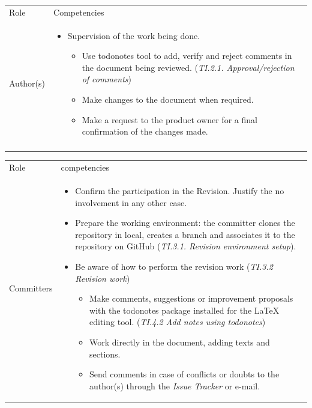 \documentclass{template/openetcs_article}
\begin{document}
\begin{flushleft}
\begin{tabular}{|m{3cm}|m{11cm}|}
\hline
\rowcolor{myblue}
\multicolumn{2}{|c|}{Roles} \\\hline
\rowcolor{lightgray}
Role &
Competencies \\\hline
Author(s) & 
\begin{itemize}
\item Supervision of the work being done. 
\begin{itemize}
\item Use todonotes tool to add, verify and reject comments in the document being reviewed. ({\it TI.2.1. Approval/rejection of comments})
\item Make changes to the document when required.
\item Make a request to the product owner for a final confirmation of the changes made. 
\end{itemize}
\end{itemize}
\\\\\hline
\end{tabular}
\end{flushleft}

\begin{flushleft}
\begin{tabular}{|m{3cm}|m{11cm}|}
\hline
\rowcolor{myblue}
\multicolumn{2}{|c|}{Roles} \\\hline
\rowcolor{lightgray}
Role &
competencies 
\\\hline
Committers &
\begin{itemize}
\item Confirm the participation in the Revision. Justify the no involvement in any other case.
\item Prepare the working environment: the committer clones the repository in local, creates a branch and associates it to the repository on GitHub ({\it TI.3.1. Revision environment setup}).
\item Be aware of how to perform the revision work ({\it TI.3.2 Revision work})
\begin{itemize}
\item Make comments, suggestions or improvement proposals with the todonotes package installed for the LaTeX editing tool. ({\it TI.4.2 Add notes using todonotes})
\item Work directly in the document, adding texts and sections. 
\item Send comments in case of conflicts or doubts to the author(s) through the {\it Issue Tracker} or e-mail.
\end{itemize}
\end{itemize}
\\\hline
\end{tabular}
\end{flushleft}
\end{document}
